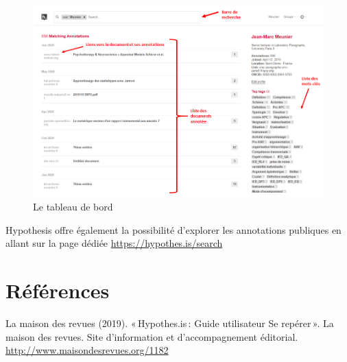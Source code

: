 \documentclass[
]{book}
\begin{document}
\begin{figure}
\centering
\includegraphics{img/dashboard.png}
\caption{Le tableau de bord}
\end{figure}

Hypothesis offre également la possibilité d'explorer les annotations publiques en allant sur la page dédiée \url{https://hypothes.is/search}

\hypertarget{ruxe9fuxe9rences}{%
\chapter*{Références}\label{ruxe9fuxe9rences}}

La maison des revues (2019). «\,Hypothes.is\,: Guide utilisateur Se repérer\,». La maison des revues. Site d'information et d'accompagnement éditorial. \url{http://www.maisondesrevues.org/1182}

  
\end{document}
